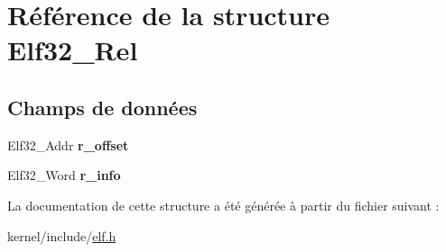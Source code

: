 \hypertarget{structElf32__Rel}{\section{Référence de la structure Elf32\-\_\-\-Rel}
\label{structElf32__Rel}
}
\subsection*{Champs de données}
\begin{DoxyCompactItemize}
\item 
\hypertarget{structElf32__Rel_addcf5ef67ababeb4940889e912c11eff}{Elf32\-\_\-\-Addr {\bfseries r\-\_\-offset}}\label{structElf32__Rel_addcf5ef67ababeb4940889e912c11eff}

\item 
\hypertarget{structElf32__Rel_a81c52bb1589056c5d37d58b9bfe2a046}{Elf32\-\_\-\-Word {\bfseries r\-\_\-info}}\label{structElf32__Rel_a81c52bb1589056c5d37d58b9bfe2a046}

\end{DoxyCompactItemize}


La documentation de cette structure a été générée à partir du fichier suivant \-:\begin{DoxyCompactItemize}
\item 
kernel/include/\hyperlink{elf_8h}{elf.\-h}\end{DoxyCompactItemize}
